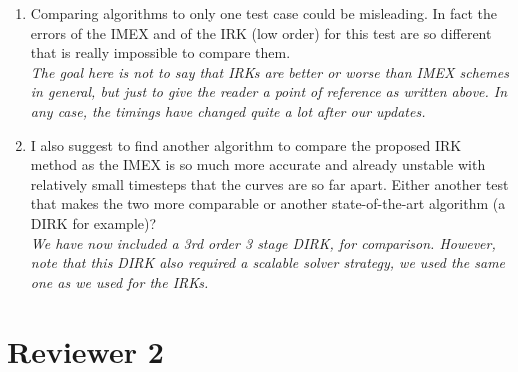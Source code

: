 \documentclass[a4paper,12pt]{article}
\begin{document}
\begin{enumerate}
{  As we mentioned above, the tolerance in the mass matrix solve for the
  IMEX scheme is important to keep tight, since otherwise we do not converge
  to the right solution as $\Delta t \to 0$. However, this mass solve
  does not dominate the IMEX cost.}
\item Comparing algorithms to only one test case could be
  misleading. In fact the errors of the IMEX and of the IRK (low
  order) for this test are so different that is really impossible to
  compare them.\\
  \emph{The goal here is not to say that IRKs are better or worse than IMEX
  schemes in general, but just to give the reader a point of reference
  as written above. In any case, the timings have changed quite a lot after
  our updates.}
\item I also suggest to find another algorithm to compare the proposed IRK method as the IMEX is so much more accurate and already unstable with relatively small timesteps that the curves are so far apart. Either another test that makes the two more comparable or another state-of-the-art algorithm (a DIRK for example)?\\
  \emph{We have now included a 3rd order 3 stage DIRK, for comparison.
  However, note that this DIRK also required a scalable solver strategy,
  we used the same one as we used for the IRKs.
  }
\end{enumerate}




\section{Reviewer 2}

\end{document}
